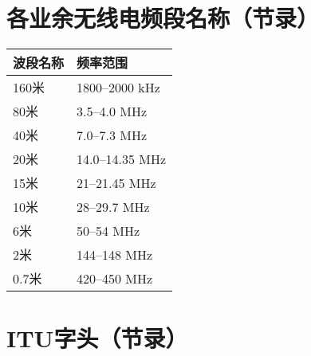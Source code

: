 \newpage








\section{各业余无线电频段名称（节录）}


\begin{longtable}{|l|l|}
	\hline
	\textbf{波段名称} & \textbf{频率范围} \\
	\hline
	160米 & 1800–2000 \si{\kHz} \\
	\hline
	80米 & 3.5–4.0 \si{\MHz} \\
	\hline
	40米 & 7.0–7.3 \si{\MHz} \\
	\hline
	20米 & 14.0–14.35 \si{\MHz} \\
	\hline
	15米 & 21–21.45 \si{\MHz} \\
	\hline
	10米 & 28–29.7 \si{\MHz} \\
	\hline
	6米 & 50–54 \si{\MHz} \\
	\hline
	2米 & 144–148 \si{\MHz} \\
	\hline
	0.7米 & 420–450 \si{\MHz} \\
	\hline
\end{longtable}

\newpage








\section{ITU字头（节录）}


